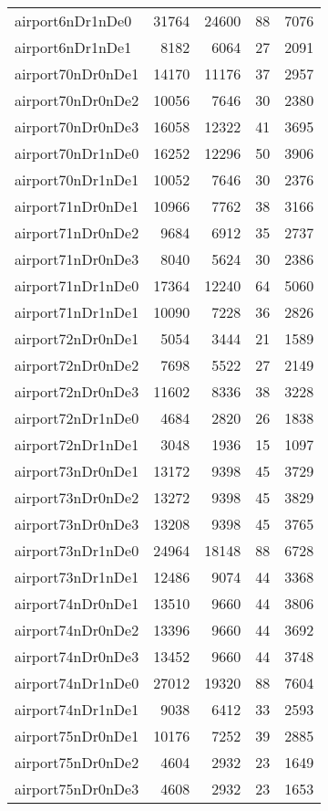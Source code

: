 \begin{tabular}{lrrrr}
airport6nDr1nDe0 & 31764 & 24600 & 88 & 7076 \\
airport6nDr1nDe1 & 8182 & 6064 & 27 & 2091 \\
airport70nDr0nDe1 & 14170 & 11176 & 37 & 2957 \\
airport70nDr0nDe2 & 10056 & 7646 & 30 & 2380 \\
airport70nDr0nDe3 & 16058 & 12322 & 41 & 3695 \\
airport70nDr1nDe0 & 16252 & 12296 & 50 & 3906 \\
airport70nDr1nDe1 & 10052 & 7646 & 30 & 2376 \\
airport71nDr0nDe1 & 10966 & 7762 & 38 & 3166 \\
airport71nDr0nDe2 & 9684 & 6912 & 35 & 2737 \\
airport71nDr0nDe3 & 8040 & 5624 & 30 & 2386 \\
airport71nDr1nDe0 & 17364 & 12240 & 64 & 5060 \\
airport71nDr1nDe1 & 10090 & 7228 & 36 & 2826 \\
airport72nDr0nDe1 & 5054 & 3444 & 21 & 1589 \\
airport72nDr0nDe2 & 7698 & 5522 & 27 & 2149 \\
airport72nDr0nDe3 & 11602 & 8336 & 38 & 3228 \\
airport72nDr1nDe0 & 4684 & 2820 & 26 & 1838 \\
airport72nDr1nDe1 & 3048 & 1936 & 15 & 1097 \\
airport73nDr0nDe1 & 13172 & 9398 & 45 & 3729 \\
airport73nDr0nDe2 & 13272 & 9398 & 45 & 3829 \\
airport73nDr0nDe3 & 13208 & 9398 & 45 & 3765 \\
airport73nDr1nDe0 & 24964 & 18148 & 88 & 6728 \\
airport73nDr1nDe1 & 12486 & 9074 & 44 & 3368 \\
airport74nDr0nDe1 & 13510 & 9660 & 44 & 3806 \\
airport74nDr0nDe2 & 13396 & 9660 & 44 & 3692 \\
airport74nDr0nDe3 & 13452 & 9660 & 44 & 3748 \\
airport74nDr1nDe0 & 27012 & 19320 & 88 & 7604 \\
airport74nDr1nDe1 & 9038 & 6412 & 33 & 2593 \\
airport75nDr0nDe1 & 10176 & 7252 & 39 & 2885 \\
airport75nDr0nDe2 & 4604 & 2932 & 23 & 1649 \\
airport75nDr0nDe3 & 4608 & 2932 & 23 & 1653 \\

\end{tabular}

